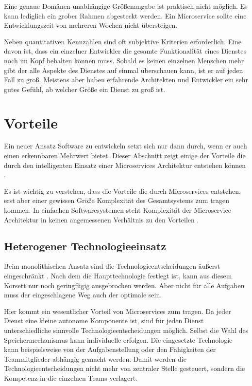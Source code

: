 Eine genaue Domänen-unabhängige Größenangabe ist praktisch nicht möglich. Es kann lediglich ein grober Rahmen abgesteckt werden. Ein Microservice sollte eine Entwicklungszeit von mehreren Wochen nicht übersteigen.

Neben quantitativen Kennzahlen sind oft subjektive Kriterien erforderlich. Eine davon ist, dass ein einzelner Entwickler die gesamte Funktionalität eines Dienstes noch im Kopf behalten können muss. Sobald es keinen einzelnen Menschen mehr gibt der alle Aspekte des Dienstes auf einmal überschauen kann, ist er auf jeden Fall zu groß. Meistens aber haben erfahrende Architekten und Entwickler ein sehr gutes Gefühl, ab welcher Größe ein Dienst zu groß ist.

\section{Vorteile}

Ein neuer Ansatz Software zu entwickeln setzt sich nur dann durch, wenn er auch einen erkennbaren Mehrwert bietet. Dieser Abschnitt zeigt einige der Vorteile die durch den intelligenten Einsatz einer Microservices Architektur entstehen können \cite{fowlerMSTradeOffs,newman2015building}.

Es ist wichtig zu verstehen, dass die Vorteile die durch Microservices entstehen, erst aber einer gewissen Größe \bzw Komplexität des Gesamtsystems zum tragen kommen. In einfachen Softwaresystemen steht Komplexität der Microservice Architektur in keinen angemessenen Verhältnis zu den Vorteilen \cite{fowlerMSPremium}.

\subsection{Heterogener Technologieeinsatz}

Beim monolithischen Ansatz sind die Technologieentscheidungen äußerst eingeschränkt \cite{fowlerMSTradeOffs}. Nach dem die Haupttechnologie festlegt ist, kann aus diesem Korsett nur noch geringfügig ausgebrochen werden. Aber nicht für alle Aufgaben muss der eingeschlagene Weg auch der optimale sein.

Hier kommt ein wesentlicher Vorteil von Microservices zum tragen. Da jeder Dienst eine kleine autonome Komponente ist, sind für jeden Dienst unterschiedliche sinnvolle Technologieentscheidungen möglich. Selbst die Wahl des Speichermechanismus kann individuelle erfolgen. Die eingesetzte Technologie kann beispielsweise von der Aufgabenstellung oder den Fähigkeiten der Teammitglieder abhängig gemacht werden. Damit werden die Technologieentscheidungen nicht mehr von zentraler Stelle gesteuert, sondern die Kompetenz in die einzelnen Teams verlagert.

